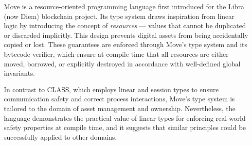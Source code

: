 Move \cite{Move:2019,Move:2020} is a resource-oriented programming language first introduced for the Libra (now Diem) blockchain project. Its type system draws inspiration from linear logic by introducing the concept of \textit{resources} --- values that cannot be duplicated or discarded implicitly. This design prevents digital assets from being accidentally copied or lost. These guarantees are enforced through Move's type system and its bytecode verifier, which ensure at compile time that all resources are either moved, borrowed, or explicitly destroyed in accordance with well-defined global invariants.

In contrast to \ac{CLASS}, which employs linear and session types to ensure communication safety and correct process interactions, Move's type system is tailored to the domain of asset management and ownership. Nevertheless, the language demonstrates the practical value of linear types for enforcing real-world safety properties at compile time, and it suggests that similar principles could be successfully applied to other domains.
